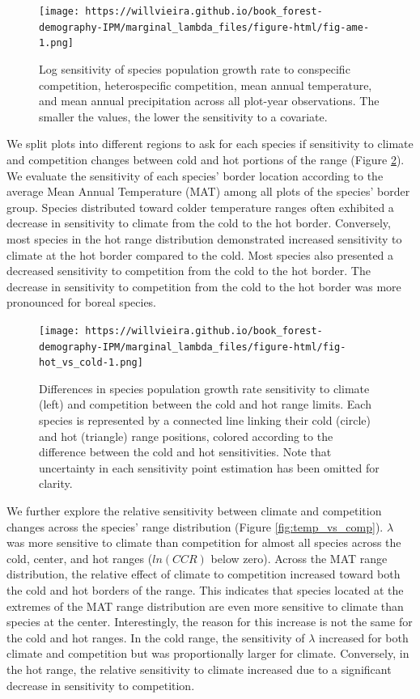 \documentclass[12pt]{article}
\begin{document}
\begin{figure}
\hypertarget{fig:mean_sens}{%
\centering
\texttt{[image: https://willvieira.github.io/book\_forest-demography-IPM/marginal\_lambda\_files/figure-html/fig-ame-1.png]}
\caption{Log sensitivity of species population growth rate to
conspecific competition, heterospecific competition, mean annual
temperature, and mean annual precipitation across all plot-year
observations. The smaller the values, the lower the sensitivity to a
covariate.}\label{fig:mean_sens}
}
\end{figure}

We split plots into different regions to ask for each species if
sensitivity to climate and competition changes between cold and hot
portions of the range (Figure \ref{fig:cold_vs_hot}). We evaluate the
sensitivity of each species' border location according to the average
Mean Annual Temperature (MAT) among all plots of the species' border
group. Species distributed toward colder temperature ranges often
exhibited a decrease in sensitivity to climate from the cold to the hot
border. Conversely, most species in the hot range distribution
demonstrated increased sensitivity to climate at the hot border compared
to the cold. Most species also presented a decreased sensitivity to
competition from the cold to the hot border. The decrease in sensitivity
to competition from the cold to the hot border was more pronounced for
boreal species.

\begin{figure}
\hypertarget{fig:cold_vs_hot}{%
\centering
\texttt{[image: https://willvieira.github.io/book\_forest-demography-IPM/marginal\_lambda\_files/figure-html/fig-hot\_vs\_cold-1.png]}
\caption{Differences in species population growth rate sensitivity to
climate (left) and competition between the cold and hot range limits.
Each species is represented by a connected line linking their cold
(circle) and hot (triangle) range positions, colored according to the
difference between the cold and hot sensitivities. Note that uncertainty
in each sensitivity point estimation has been omitted for
clarity.}\label{fig:cold_vs_hot}
}
\end{figure}

We further explore the relative sensitivity between climate and
competition changes across the species' range distribution (Figure
\ref{fig:temp_vs_comp}). \(\lambda\) was more sensitive to climate than
competition for almost all species across the cold, center, and hot
ranges (\(ln(CCR)\) below zero). Across the MAT range distribution, the
relative effect of climate to competition increased toward both the cold
and hot borders of the range. This indicates that species located at the
extremes of the MAT range distribution are even more sensitive to
climate than species at the center. Interestingly, the reason for this
increase is not the same for the cold and hot ranges. In the cold range,
the sensitivity of \(\lambda\) increased for both climate and
competition but was proportionally larger for climate. Conversely, in
the hot range, the relative sensitivity to climate increased due to a
significant decrease in sensitivity to competition.
\end{document}
